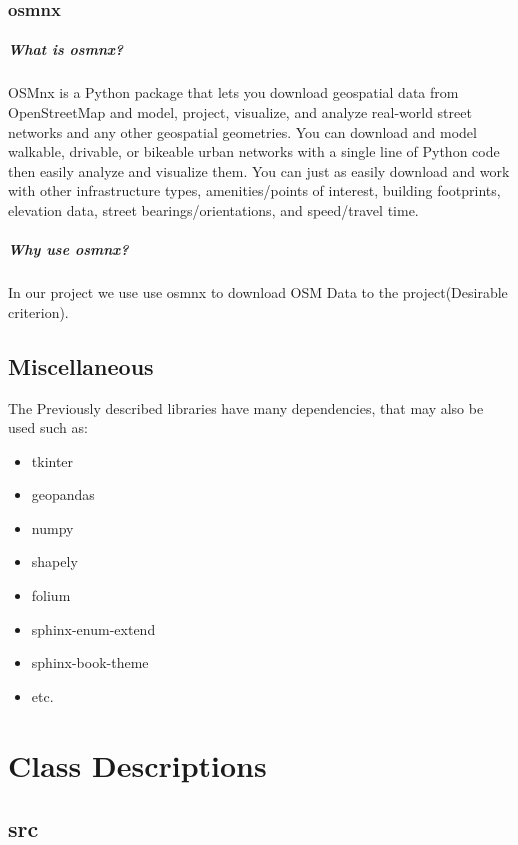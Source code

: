 \documentclass[letterpaper,10pt,english]{sphinxmanual}
\begin{document}
\subsection{osmnx}

\paragraph{What is osmnx?}
OSMnx is a Python package that lets you download geospatial data from OpenStreetMap and model, project, visualize, and analyze real-world street networks and any other geospatial geometries. You can download and model walkable, drivable, or bikeable urban networks with a single line of Python code then easily analyze and visualize them. You can just as easily download and work with other infrastructure types, amenities/points of interest, building footprints, elevation data, street bearings/orientations, and speed/travel time.

\paragraph{Why use osmnx?}
In our project we use use osmnx to download OSM Data to the project(Desirable criterion).

\newpage

\section{Miscellaneous}
The Previously described libraries have many dependencies, that may also be used such as:
\begin{itemize}
    \item tkinter
    \item geopandas
    \item numpy
    \item shapely
    \item folium
    \item sphinx-enum-extend
    \item sphinx-book-theme 
    \item etc.
\end{itemize}


\chapter{Class Descriptions}
\label{\detokenize{index:class-descriptions}}
\sphinxstepscope


\section{src}
\label{\detokenize{apidoc/modules:src}}\label{\detokenize{apidoc/modules::doc}}
\sphinxstepscope
\end{document}
